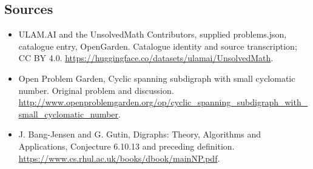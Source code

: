 \documentclass[11pt,a4paper]{article}
\begin{document}
\subsection{Sources}
\begin{itemize}
\item[S1] ULAM.AI and the UnsolvedMath Contributors, supplied problems.json, catalogue entry, OpenGarden. Catalogue identity and source transcription; CC BY 4.0.
\url{https://huggingface.co/datasets/ulamai/UnsolvedMath}.
\item[S2] Open Problem Garden, Cyclic spanning subdigraph with small cyclomatic number. Original problem and discussion.
\url{http://www.openproblemgarden.org/op/cyclic_spanning_subdigraph_with_small_cyclomatic_number}.
\item[S3] J. Bang-Jensen and G. Gutin, Digraphs: Theory, Algorithms and Applications, Conjecture 6.10.13 and preceding definition.
\url{https://www.cs.rhul.ac.uk/books/dbook/mainNP.pdf}.
\end{itemize}
\end{document}
